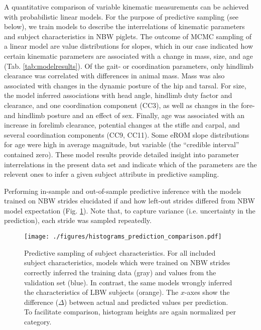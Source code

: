 A quantitative comparison of variable kinematic measurements can be achieved with probabilistic linear models.
For the purpose of predictive sampling (see below), we train models to describe the interrelations of kinematic parameters and subject characteristics in NBW piglets.
The outcome of MCMC sampling of a linear model are value distributions for slopes, which in our case indicated how certain kinematic parameters are associated with a change in mass, size, and age (Tab. \ref{tab:modelresults}).
Of the gait- or coordination parameters, only hindlimb clearance was correlated with differences in animal mass.
Mass was also associated with changes in the dynamic posture of the hip and tarsal.
For size, the model inferred associations with head angle, hindlimb duty factor and clearance, and one coordination component (CC3), as well as changes in the fore- and hindlimb posture and an effect of sex.
Finally, age was associated with an increase in forelimb clearance, potential changes at the stifle and carpal, and several coordination components (CC9, CC11).
Some eROM slope distributions for age were high in average magnitude, but variable (the ``credible interval'' contained zero).
These model results provide detailed insight into parameter interrelations in the present data set and indicate which of the parameters are the relevent ones to infer a given subject attribute in predictive sampling.



\bigskip

Performing in-sample and out-of-sample predictive inference with the models trained on NBW strides elucidated if and how left-out strides differed from NBW model expectation (Fig. \ref{fig:predictions}).
Note that, to capture variance (i.e. uncertainty in the prediction), each stride was sampled repeatedly.

\begin{figure}[t!]
\centering
\texttt{[image: ./figures/histograms\_prediction\_comparison.pdf]}
\caption{\label{fig:predictions}Predictive sampling of subject characteristics. For all included subject characteristics, models which were trained on NBW strides correctly inferred the training data (gray) and values from the validation set (blue). In contrast, the same models wrongly inferred the characteristics of LBW subjects (orange). The \(x\)-axes show the difference (\(\Delta\)) between actual and predicted values per prediction. To facilitate comparison, histogram heights are again normalized per category.}
\end{figure}



